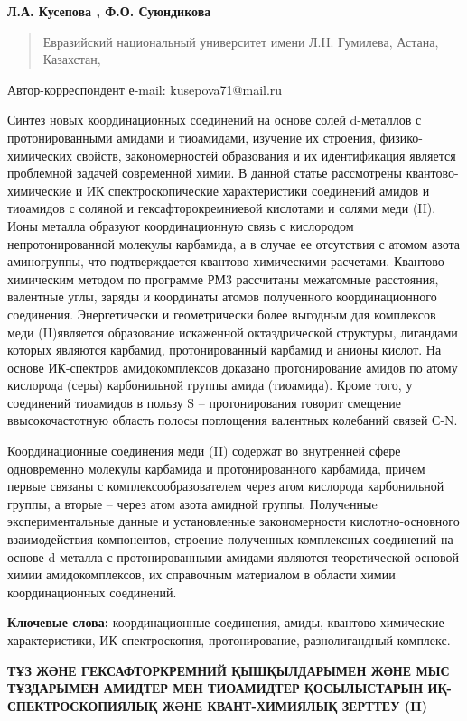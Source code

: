 \textbf{Л.А. Кусепова , Ф.О. Суюндикова}

\begin{quote}
Евразийский национальный университет имени Л.Н. Гумилева, Астана,
Казахстан,
\end{quote}

Автор-корреспондент е-mail: kusepova71@mail.ru

Синтез новых координационных соединений на основе солей d-металлов с
протонированными амидами и тиоамидами, изучение их строения,
физико-химических свойств, закономерностей образования и их
идентификация является проблемной задачей современной химии. В данной
статье рассмотрены квантово-химические и ИК спектроскопические
характеристики соединений амидов и тиоамидов с соляной и
гексафторокремниевой кислотами и солями меди (II). Ионы металла образуют
координационную связь с кислородом непротонированной молекулы карбамида,
а в случае ее отсутствия с атомом азота аминогруппы, что подтверждается
квантово-химическими расчетами. Квантово-химическим методом по программе
РМ3 рассчитаны межатомные расстояния, валентные углы, заряды и
координаты атомов полученного координационного соединения. Энергетически
и геометрически более выгодным для комплексов меди (II)является
образование искаженной октаэдрической структуры, лигандами которых
являются карбамид, протонированный карбамид и анионы кислот. На основе
ИК-спектров амидокомплексов доказано протонирование амидов по атому
кислорода (серы) карбонильной группы амида (тиоамида). Кроме того, у
соединений тиоамидов в пользу S -- протонирования говорит смещение
ввысокочастотную область полосы поглощения валентных колебаний связей
С-N.

Координационные соединения меди (II) содержат во внутренней сфере
одновременно молекулы карбамида и протонированного карбамида, причем
первые связаны с комплексообразователем через атом кислорода
карбонильной группы, а вторые -- через атом азота амидной группы.
Получeнныe экспериментальные данные и установленные закономерности
кислотно-основного взаимодействия компонентов, строение полученных
комплексных соединений на основе d-металла с протонированными амидами
являются теоретической основой химии амидокомплексов, их справочным
материалом в области химии координационных соединений.

\textbf{Ключевые слова:} координационные соединения, амиды,
квантово-химические характеристики, ИК-спектроскопия, протонирование,
разнолигандный комплекс.

\textbf{ТҰЗ ЖӘНЕ ГЕКСАФТОРКРЕМНИЙ ҚЫШҚЫЛДАРЫМЕН ЖӘНЕ МЫС ТҰЗДАРЫМЕН
АМИДТЕР МЕН ТИОАМИДТЕР ҚОСЫЛЫСТАРЫН ИҚ-СПЕКТРОСКОПИЯЛЫҚ ЖӘНЕ
КВАНТ-ХИМИЯЛЫҚ ЗЕРТТЕУ (II)}

